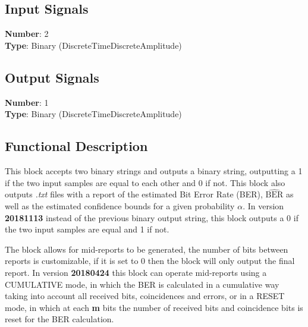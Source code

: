 \begin{refsection}
\subsection*{Input Signals}

\textbf{Number}: 2\\
\textbf{Type}: Binary (DiscreteTimeDiscreteAmplitude)


\subsection*{Output Signals}

\textbf{Number}: 1\\
\textbf{Type}: Binary (DiscreteTimeDiscreteAmplitude)

\subsection*{Functional Description}

This block accepts two binary strings and outputs a binary string, outputting a 1 if the two input samples are equal to each other and 0 if not. This block also outputs \textit{.txt} files with a report of the estimated Bit Error Rate (BER), $\widehat{\text{BER}}$ as well as the estimated confidence bounds for a given probability $\alpha$. In version \textbf{20181113} instead of the previous binary output string, this block outputs a 0 if the two input samples are equal and 1 if not.
\par
The block allows for mid-reports to be generated, the number of bits between reports is customizable, if it is set to 0 then the block will only output the final report. In version \textbf{20180424} this block can operate mid-reports using a CUMULATIVE mode, in which the BER is calculated in a cumulative way taking into account all received bits, coincidences and errors, or in a RESET mode, in which at each \textbf{m} bits the number of received bits and coincidence bits is reset for the BER calculation.


\end{refsection}
